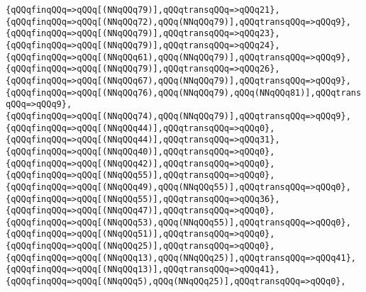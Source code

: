 \verb|{qQQqfinqQQq=>qQQq[(NNqQQq79)],qQQqtransqQQq=>qQQq21},|\newline
\verb|{qQQqfinqQQq=>qQQq[(NNqQQq72),qQQq(NNqQQq79)],qQQqtransqQQq=>qQQq9},|\newline
\verb|{qQQqfinqQQq=>qQQq[(NNqQQq79)],qQQqtransqQQq=>qQQq23},|\newline
\verb|{qQQqfinqQQq=>qQQq[(NNqQQq79)],qQQqtransqQQq=>qQQq24},|\newline
\verb|{qQQqfinqQQq=>qQQq[(NNqQQq61),qQQq(NNqQQq79)],qQQqtransqQQq=>qQQq9},|\newline
\verb|{qQQqfinqQQq=>qQQq[(NNqQQq79)],qQQqtransqQQq=>qQQq26},|\newline
\verb|{qQQqfinqQQq=>qQQq[(NNqQQq67),qQQq(NNqQQq79)],qQQqtransqQQq=>qQQq9},|\newline
\verb|{qQQqfinqQQq=>qQQq[(NNqQQq76),qQQq(NNqQQq79),qQQq(NNqQQq81)],qQQqtransqQQq=>qQQq9},|\newline
\verb|{qQQqfinqQQq=>qQQq[(NNqQQq74),qQQq(NNqQQq79)],qQQqtransqQQq=>qQQq9},|\newline
\verb|{qQQqfinqQQq=>qQQq[(NNqQQq44)],qQQqtransqQQq=>qQQq0},|\newline
\verb|{qQQqfinqQQq=>qQQq[(NNqQQq44)],qQQqtransqQQq=>qQQq31},|\newline
\verb|{qQQqfinqQQq=>qQQq[(NNqQQq40)],qQQqtransqQQq=>qQQq0},|\newline
\verb|{qQQqfinqQQq=>qQQq[(NNqQQq42)],qQQqtransqQQq=>qQQq0},|\newline
\verb|{qQQqfinqQQq=>qQQq[(NNqQQq55)],qQQqtransqQQq=>qQQq0},|\newline
\verb|{qQQqfinqQQq=>qQQq[(NNqQQq49),qQQq(NNqQQq55)],qQQqtransqQQq=>qQQq0},|\newline
\verb|{qQQqfinqQQq=>qQQq[(NNqQQq55)],qQQqtransqQQq=>qQQq36},|\newline
\verb|{qQQqfinqQQq=>qQQq[(NNqQQq47)],qQQqtransqQQq=>qQQq0},|\newline
\verb|{qQQqfinqQQq=>qQQq[(NNqQQq53),qQQq(NNqQQq55)],qQQqtransqQQq=>qQQq0},|\newline
\verb|{qQQqfinqQQq=>qQQq[(NNqQQq51)],qQQqtransqQQq=>qQQq0},|\newline
\verb|{qQQqfinqQQq=>qQQq[(NNqQQq25)],qQQqtransqQQq=>qQQq0},|\newline
\verb|{qQQqfinqQQq=>qQQq[(NNqQQq13),qQQq(NNqQQq25)],qQQqtransqQQq=>qQQq41},|\newline
\verb|{qQQqfinqQQq=>qQQq[(NNqQQq13)],qQQqtransqQQq=>qQQq41},|\newline
\verb|{qQQqfinqQQq=>qQQq[(NNqQQq5),qQQq(NNqQQq25)],qQQqtransqQQq=>qQQq0},|\newline
